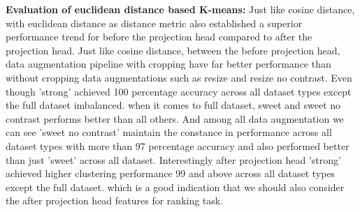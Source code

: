 \begin{table}[H]
    \centering
    \caption{Evaluation Results on Different Datasets and Augmentations with Euclidean Distance}
    \label{tab:evaluation_results_euclidean}
\end{table}

    
\textbf{Evaluation of euclidean distance based K-means:}
Just like  cosine distance, with euclidean distance as distance metric also established a superior performance trend for before the projection head compared to after the projection head. Just like  cosine distance, between the before projection head, data augmentation pipeline with cropping have far better performance than without cropping data augmentations such as resize and resize no contrast. Even though 'strong' achieved 100 percentage accuracy across all dataset types except the full dataset imbalanced. when it comes to full dataset, sweet and sweet no contrast performs better than all others. And among all data augmentation we can see 'sweet no contrast' maintain the constance in performance across all dataset types with more than 97 percentage accuracy and also performed better than just 'sweet' across all dataset. Interestingly after projection head  'strong' achieved higher clustering performance 99 and above across all dataset types except the full dataset. which is a good indication that we should also consider the after projection head features for ranking task.

